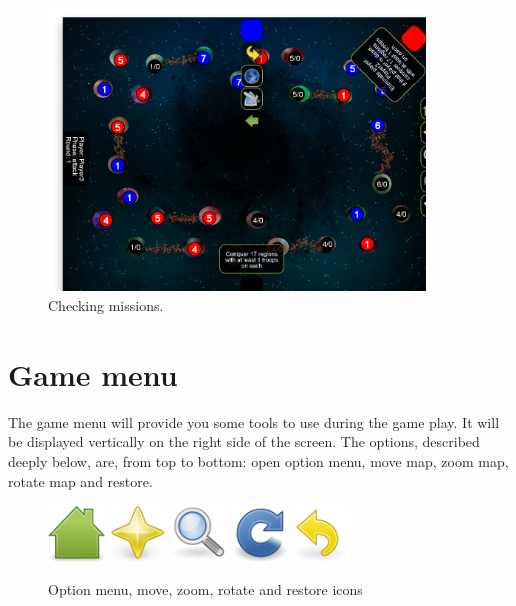 \documentclass[12pt,a4paper]{article}
\begin{document}
\begin{figure}[h!]
\centering
\includegraphics[width=10cm]{pic/screenshot13.png}
\caption{Checking missions.}
\label{fig:checkmis}
\end{figure}


\section{Game menu}
The game menu will provide you some tools to use during the game play. It will be displayed vertically on the right side of the screen. The options, described deeply below, are, from top to bottom: open option menu, move map, zoom map, rotate map and restore.

\begin{figure}[h!]
\centering
\includegraphics[width=1.5cm]{pic/home.png}
\includegraphics[width=1.5cm]{pic/move.png}
\includegraphics[width=1.5cm]{pic/zoom.png}
\includegraphics[width=1.5cm]{pic/rotate.png}
\includegraphics[width=1.5cm]{pic/undo.png}
\caption{Option menu, move, zoom, rotate and restore icons}
\label{fig:mapmenu}
\end{figure}
\end{document}
